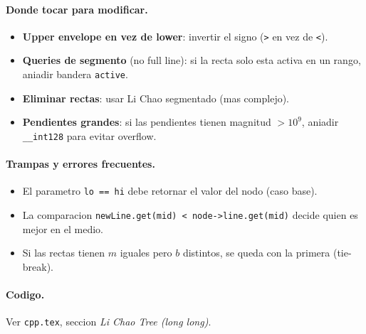 \paragraph{Donde tocar para modificar.}
\begin{itemize}\setlength\itemsep{0pt}
	\item \textbf{Upper envelope en vez de lower}: invertir el signo (\texttt{>} en vez de \texttt{<}).
	\item \textbf{Queries de segmento} (no full line): si la recta solo esta activa en un rango, aniadir bandera \texttt{active}.
	\item \textbf{Eliminar rectas}: usar Li Chao segmentado (mas complejo).
	\item \textbf{Pendientes grandes}: si las pendientes tienen magnitud $> 10^9$, aniadir \texttt{\_\_int128} para evitar overflow.
\end{itemize}

\paragraph{Trampas y errores frecuentes.}
\begin{itemize}\setlength\itemsep{0pt}
	\item El parametro \texttt{lo == hi} debe retornar el valor del nodo (caso base).
	\item La comparacion \texttt{newLine.get(mid) < node->line.get(mid)} decide quien es mejor en el medio.
	\item Si las rectas tienen $m$ iguales pero $b$ distintos, se queda con la primera (tie-break).
\end{itemize}

\paragraph{Codigo.}
Ver \texttt{cpp.tex}, seccion \textit{Li Chao Tree (long long)}.

\vspace{0.5em}
